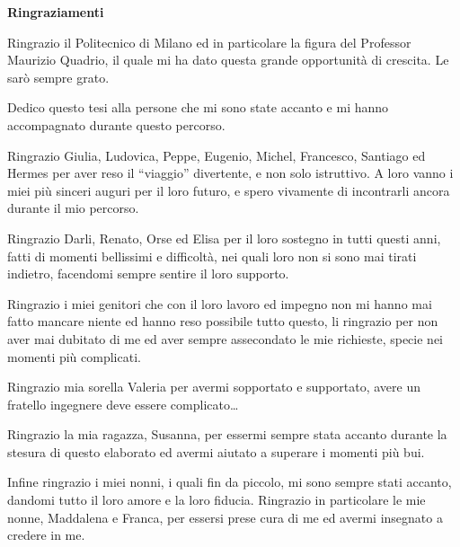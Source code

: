 \documentclass[a4paper,twosides,openright,titlepage]{book}
\newenvironment{abstract}%
	{\cleardoublepage%
		\thispagestyle{empty}%
		\null \vfill\begin{center}%
		\bfseries \abstractname \end{center}}%
	{\vfill\null}
\begin{document}
\renewcommand{\abstractname}{Ringraziamenti}
\begin{abstract}
\hrulefill

Ringrazio il Politecnico di Milano ed in particolare la figura del Professor Maurizio Quadrio, il quale mi ha dato questa grande opportunità di crescita. Le sarò sempre grato.\par
Dedico questo tesi alla persone che mi sono state accanto e mi hanno accompagnato durante questo percorso. \par
Ringrazio Giulia, Ludovica, Peppe, Eugenio, Michel, Francesco, Santiago ed Hermes per aver reso il ``viaggio'' divertente, e non solo istruttivo.
A loro vanno i miei più sinceri auguri per il loro futuro, e spero vivamente di incontrarli ancora durante il mio percorso.\par
Ringrazio Darli, Renato, Orse ed Elisa per il loro sostegno in tutti questi anni, fatti di momenti bellissimi e difficoltà, nei quali loro non si sono mai tirati indietro, facendomi sempre sentire il loro supporto.\par
Ringrazio i miei genitori che con il loro lavoro ed impegno non mi hanno mai fatto mancare niente ed hanno reso possibile tutto questo, li ringrazio per non aver mai dubitato di me ed aver sempre assecondato le mie richieste, specie nei momenti più complicati.\par
Ringrazio mia sorella Valeria per avermi sopportato e supportato, avere un fratello ingegnere deve essere complicato\dots \par
Ringrazio la mia ragazza, Susanna, per essermi sempre stata accanto durante la stesura di questo elaborato ed avermi aiutato a superare i momenti più bui.

Infine ringrazio i miei nonni, i quali fin da piccolo, mi sono sempre stati accanto, dandomi tutto il loro amore e la loro fiducia. Ringrazio in particolare le mie nonne, Maddalena e Franca, per essersi prese cura di me ed avermi insegnato a credere in me.\par
\hrulefill
\end{abstract}




\tableofcontents 



\mainmatter












%



\backmatter
{} 
\printbibliography
\end{document}
